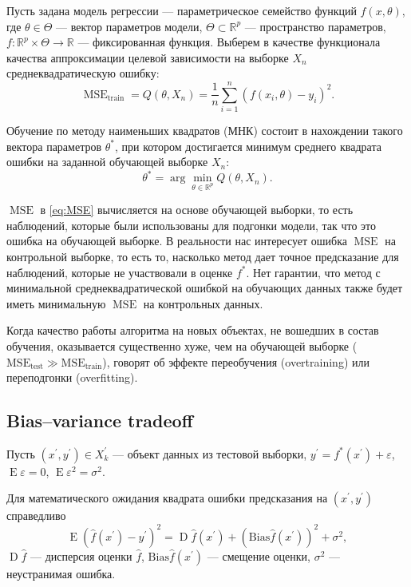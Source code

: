 \documentclass[11pt,colorlinks=true]{article}
\DeclareMathOperator{\MSE}{MSE}
\DeclareMathOperator{\E}{E}
\DeclareMathOperator{\D}{D}
\begin{document}
Пусть задана модель регрессии --- параметрическое семейство функций $f(x,\theta)$, где $\theta\in\Theta$ --- вектор параметров модели, $\Theta\subset\mathbb{R}^{p}$ --- пространство параметров,
$f:\mathbb{R}^{p}\times\Theta\rightarrow\mathbb{R}$ --- фиксированная функция.
Выберем в качестве функционала качества аппроксимации целевой зависимости на выборке $X_{n}$ среднеквадратическую ошибку:
\begin{equation}\label{eq:MSE}
\MSE_{\text{train}}
=
Q(\theta,X_{n})=
\frac{1}{n}
\sum_{i=1}^{n}
(f(x_{i},\theta)-y_{i})^{2}.
\end{equation}

Обучение по методу наименьших квадратов (МНК) состоит в нахождении такого вектора параметров $\theta^{\ast}$, при котором достигается минимум среднего квадрата ошибки на заданной обучающей выборке $X_{n}$:
\begin{equation*}
\theta^{\ast}=
\arg\min_{\theta\in\mathbb{R}^{p}}
Q(\theta,X_{n}).
\end{equation*}

$\MSE$ в \eqref{eq:MSE} вычисляется на основе обучающей выборки, то есть наблюдений, которые были использованы для подгонки модели, так что это ошибка на обучающей выборке. В реальности нас интересует ошибка $\MSE$ на контрольной выборке, то есть то, насколько метод дает точное предсказание для наблюдений, которые не участвовали в оценке $f^{\ast}$. 
Нет гарантии, что метод с минимальной среднеквадратической ошибкой на обучающих данных также будет иметь минимальную $\MSE$ на контрольных данных.

Когда качество работы алгоритма на новых объектах, не вошедших в состав обучения, оказывается существенно хуже, чем на обучающей выборке ($\mathrm{MSE_{\text{test}}}\gg\mathrm{MSE}_{\text{train}}$), говорят об эффекте переобучения (overtraining) или переподгонки (overfitting).

\subsection{Bias–variance tradeoff}

Пусть $(x^{\prime},y^{\prime})\in X_{k}^{\prime}$ --- объект данных из тестовой выборки, $y^{\prime}=f^{\ast}(x^{\prime})+\varepsilon$, $\E\varepsilon=0$, $\E\varepsilon^{2}=\sigma^{2}$. 

Для математического ожидания квадрата ошибки предсказания на $(x^{\prime},y^{\prime})$ справедливо
\begin{equation}\label{eq:MSE_test_y}
\E(\hat{f}(x^{\prime})-y^{\prime})^{2}
=
\D\hat{f}(x^{\prime})+(\mathrm{Bias}\hat{f}(x^{\prime}))^{2}+\sigma^{2},
\end{equation}
$\D\hat{f}$ --- дисперсия оценки $\hat{f}$, $\mathrm{Bias}\hat{f}(x^{\prime})$ --- смещение оценки, $\sigma^{2}$ --- неустранимая ошибка.
\end{document}
